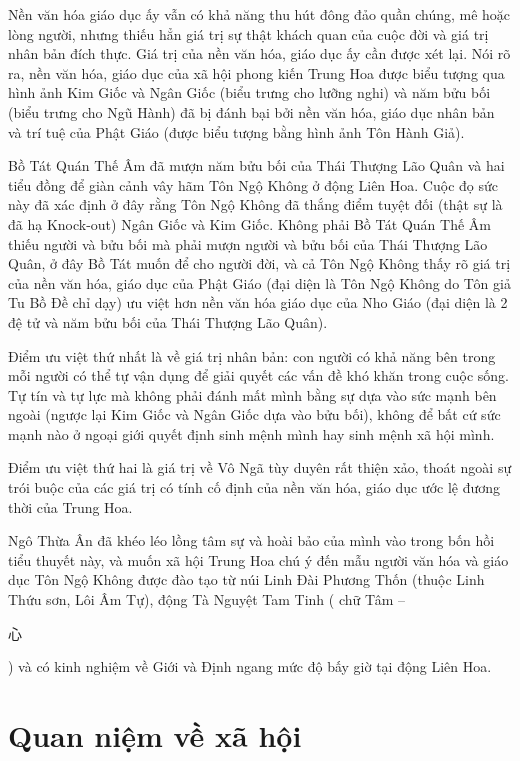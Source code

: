 Nền văn hóa giáo dục ấy vẫn có khả năng thu hút đông đảo quần chúng, mê hoặc lòng người, nhưng thiếu hẳn giá trị sự thật khách quan của cuộc đời và giá trị nhân bản đích thực. Giá trị của nền văn hóa, giáo dục ấy cần được xét lại. Nói rõ ra, nền văn hóa, giáo dục của xã hội phong kiến Trung Hoa được biểu tượng qua hình ảnh Kim Giốc và Ngân Giốc (biểu trưng cho lưỡng nghi) và năm bửu bối (biểu trưng cho Ngũ Hành) đã bị đánh bại bởi nền văn hóa, giáo dục nhân bản và trí tuệ của Phật Giáo (được biểu tượng bằng hình ảnh Tôn Hành Giả).

Bồ Tát Quán Thế Âm đã mượn năm bửu bối của Thái Thượng Lão Quân và hai tiểu đồng để giàn cảnh vây hãm Tôn Ngộ Không ở động Liên Hoa. Cuộc đọ sức này đã xác định ở đây rằng Tôn Ngộ Không đã thắng điểm tuyệt đối (thật sự là đã hạ Knock-out) Ngân Giốc và Kim Giốc. Không phải Bồ Tát Quán Thế Âm thiếu người và bửu bối mà phải mượn người và bửu bối của Thái Thượng Lão Quân, ở đây Bồ Tát muốn để cho người đời, và cả Tôn Ngộ Không thấy rõ giá trị của nền văn hóa, giáo dục của Phật Giáo (đại diện là Tôn Ngộ Không do Tôn giả Tu Bồ Đề chỉ dạy) ưu việt hơn nền văn hóa giáo dục của Nho Giáo (đại diện là 2 đệ tử và năm bửu bối của Thái Thượng Lão Quân).

Điểm ưu việt thứ nhất là về giá trị nhân bản: con người có khả năng bên trong mỗi người có thể tự vận dụng để giải quyết các vấn đề khó khăn trong cuộc sống. Tự tín và tự lực mà không phải đánh mất mình bằng sự dựa vào sức mạnh bên ngoài (ngược lại Kim Giốc và Ngân Giốc dựa vào bửu bối), không để bất cứ sức mạnh nào ở ngoại giới quyết định sinh mệnh mình hay sinh mệnh xã hội mình.

Điểm ưu việt thứ hai là giá trị về Vô Ngã tùy duyên rất thiện xảo, thoát ngoài sự trói buộc của các giá trị có tính cố định của nền văn hóa, giáo dục ước lệ đương thời của Trung Hoa.

Ngô Thừa Ân đã khéo léo lồng tâm sự và hoài bảo của mình vào trong bốn hồi tiểu thuyết này, và muốn xã hội Trung Hoa chú ý đến mẫu người văn hóa và giáo dục Tôn Ngộ Không được đào tạo từ núi Linh Đài Phương Thốn (thuộc Linh Thứu sơn, Lôi Âm Tự), động Tà Nguyệt Tam Tinh ( chữ Tâm -- \begin{CJK*}{UTF8}{gbsn}心 \end{CJK*}) và có kinh nghiệm về Giới và Định ngang mức độ bấy giờ tại động Liên Hoa.

\section{Quan niệm về xã hội} %
\label{sec:33_34_xa_hoi}

